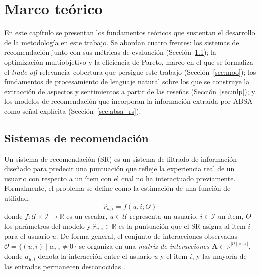 \chapter{Marco teórico} \label{chap:background}

En este capítulo se presentan los fundamentos teóricos que sustentan el desarrollo de la metodología en este trabajo. Se abordan cuatro frentes: los sistemas de recomendación junto con sus métricas de evaluación (Sección~\ref{sec:recsys}); la optimización multiobjetivo y la eficiencia de Pareto, marco en el que se formaliza el \textit{trade-off} relevancia--cobertura que persigue este trabajo (Sección~\ref{sec:moo}); los fundamentos de procesamiento de lenguaje natural sobre los que se construye la extracción de aspectos y sentimientos a partir de las reseñas (Sección~\ref{sec:nlp}); y los modelos de recomendación que incorporan la información extraída por ABSA como señal explícita (Sección~\ref{sec:absa_rs}).

\section{Sistemas de recomendación} \label{sec:recsys}

Un sistema de recomendación (SR) es un sistema de filtrado de información diseñado para predecir una puntuación que refleje la experiencia real de un usuario con respecto a un ítem con el cual no ha interactuado previamente. Formalmente, el problema se define como la estimación de una función de utilidad:
\begin{equation} \label{eq:utility}
	\hat{r}_{u,i} = f(u, i; \Theta)
\end{equation}
donde $f : \mathcal{U} \times \mathcal{I} \rightarrow \mathbb{R}$ es un escalar, $u \in \mathcal{U}$ representa un usuario, $i \in \mathcal{I}$ un ítem, $\Theta$ los parámetros del modelo y $\hat{r}_{u,i} \in \mathbb{R}$ es la puntuación que el SR asigna al item $i$ para el usuario $u$. De forma general, el conjunto de interacciones observadas $\mathcal{O} = \{(u,i) \mid a_{u,i} \neq 0\}$ se organiza en una \textit{matriz de interacciones} $\mathbf{A} \in \mathbb{R}^{|\mathcal{U}|\times|\mathcal{I}|}$, donde $a_{u,i}$ denota la interacción entre el usuario $u$ y el item $i$, y las mayoría de las entradas permanecen desconocidas \citep{adomavicius_toward_2005}.

